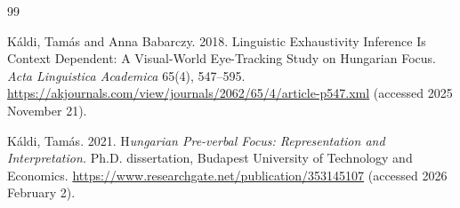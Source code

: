 \documentclass[a4paper, ruler]{CUP-JNL-LIN}%
\begin{document}
\begin{Backmatter}
\begin{thebibliography}{99}

{Káldi, Tamás and Anna Babarczy}. 2018. Linguistic Exhaustivity Inference Is Context Dependent: A Visual-World Eye-Tracking Study on Hungarian Focus. \textit{Acta Linguistica Academica} 65(4), 547--595. \url{https://akjournals.com/view/journals/2062/65/4/article-p547.xml} (accessed 2025 November 21).




{Káldi, Tamás}. 2021. H\textit{ungarian Pre-verbal Focus: Representation and Interpretation.} Ph.D. dissertation, Budapest University of Technology and Economics. \url{https://www.researchgate.net/publication/353145107}  (accessed 2026 February 2).



\end{thebibliography}
\end{Backmatter}
\end{document}

